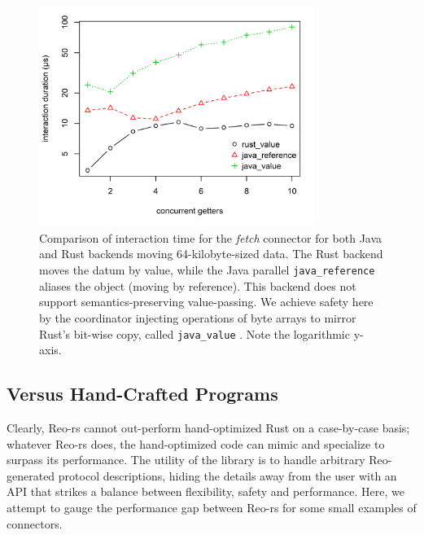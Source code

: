 \begin{figure}
	\centering
	\includegraphics[width=0.80\textwidth]{experiments/rust_v_java_2.png}
	\caption[Java vs.\ Rust interaction time for large values.]{Comparison of interaction time for the \textit{fetch} connector for both Java and Rust backends moving 64-kilobyte-sized data. The Rust backend moves the datum by value, while the Java parallel \texttt{java\_reference}  aliases the object (moving by reference). This backend does not support semantics-preserving value-passing. We achieve safety here by the coordinator injecting  operations of byte arrays to mirror Rust's bit-wise copy, called \texttt{java\_value} . Note the logarithmic y-axis.}
	\label{fig:rust_v_java_2}
\end{figure}

\subsection{Versus Hand-Crafted Programs}

Clearly, Reo-rs cannot out-perform hand-optimized Rust on a case-by-case basis; whatever Reo-rs does, the hand-optimized code can mimic and specialize to surpass its performance. The utility of the library is to handle arbitrary Reo-generated protocol descriptions, hiding the details away from the user with an API that strikes a balance between flexibility, safety and performance. Here, we attempt to gauge the performance gap between Reo-rs for some small examples of connectors.


